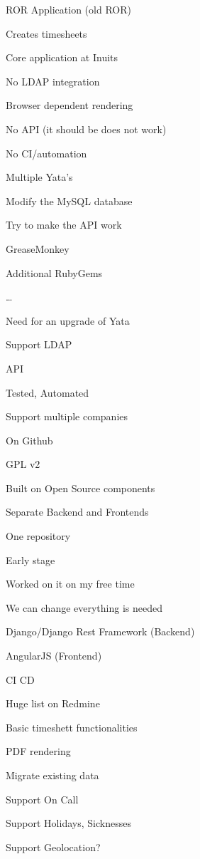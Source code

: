 \titleSlide


\inuitsSlide


\begin{iframe}[Yata]
\item ROR Application (old ROR)
\item Creates timesheets
\item Core application at Inuits
\end{iframe}
\begin{iframe}
\item No LDAP integration
\item Browser dependent rendering
\item No API (it should be does not work)
\item No CI/automation
\item Multiple Yata's
\end{iframe}
\begin{iframe}
\item Modify the MySQL database
\item Try to make the API work
\item GreaseMonkey
\item Additional RubyGems
\item \dots
\end{iframe}
\begin{iframe}[YaYaTa]
\item Need for an upgrade of Yata
\item Support LDAP
\item API
\item Tested, Automated
\item Support multiple companies
\end{iframe}
\begin{iframe}
\item On Github
\item GPL v2
\item Built on Open Source components
\item Separate Backend and Frontends
\item One repository
\end{iframe}
\begin{iframe}
\item Early stage
\item Worked on it on my free time
\item We can change everything is needed
\end{iframe}
\begin{iframe}[Technologies]
\item Django/Django Rest Framework (Backend)
\item AngularJS (Frontend)
\end{iframe}
\begin{iframe}[TODO]
\item CI CD
\item Huge list on Redmine
\item Basic timeshett functionalities
\item PDF rendering
\item Migrate existing data
\item Support On Call
\item Support Holidays, Sicknesses
\item Support Geolocation?
\end{iframe}
